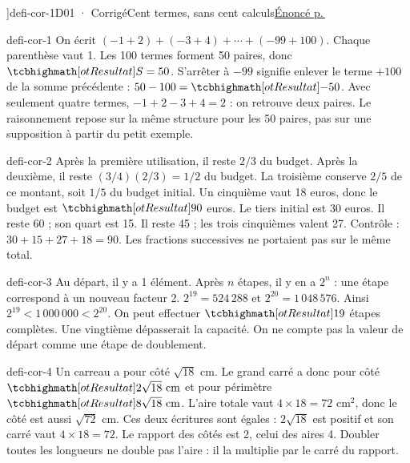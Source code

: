 \editionPage[\pdfbookmark[0]{Corrigés des défis}{bm-defi-cor-1-parent}]{defi-cor-1}{D01 · Corrigé}{Cent termes, sans cent calculs}{\hyperref[defi-ex-1]{Énoncé p.\,\pageref*{defi-ex-1}}}
\begin{blocEdition}{defi-cor-1}
On écrit $(-1+2)+(-3+4)+\cdots+(-99+100)$. Chaque parenthèse vaut 1. Les 100 termes forment 50 paires, donc $\res{S=50}$.
S’arrêter à $-99$ signifie enlever le terme $+100$ de la somme précédente : $50-100=\res{-50}$.
Avec seulement quatre termes, $-1+2-3+4=2$ : on retrouve deux paires. Le raisonnement repose sur la même structure pour les 50 paires, pas sur une supposition à partir du petit exemple.
\end{blocEdition}
\begin{blocEdition}{defi-cor-2}
Après la première utilisation, il reste $2/3$ du budget. Après la deuxième, il reste $(3/4)(2/3)=1/2$ du budget. La troisième conserve $2/5$ de ce montant, soit $1/5$ du budget initial.
Un cinquième vaut 18 euros, donc le budget est $\res{90}$ euros.
Le tiers initial est 30 euros. Il reste 60 ; son quart est 15. Il reste 45 ; les trois cinquièmes valent 27. Contrôle : $30+15+27+18=90$. Les fractions successives ne portaient pas sur le même total.
\end{blocEdition}
\begin{blocEdition}{defi-cor-3}
Au départ, il y a 1 élément. Après $n$ étapes, il y en a $2^n$ : une étape correspond à un nouveau facteur 2.
$2^{19}=524\,288$ et $2^{20}=1\,048\,576$. Ainsi $2^{19}<1\,000\,000<2^{20}$.
On peut effectuer $\res{19}$ étapes complètes. Une vingtième dépasserait la capacité. On ne compte pas la valeur de départ comme une étape de doublement.
\end{blocEdition}
\begin{blocEdition}{defi-cor-4}
Un carreau a pour côté $\sqrt{18}$ cm. Le grand carré a donc pour côté $\res{2\sqrt{18}\ \mathrm{cm}}$ et pour périmètre $\res{8\sqrt{18}\ \mathrm{cm}}$.
L’aire totale vaut $4\times18=72$ cm$^2$, donc le côté est aussi $\sqrt{72}$ cm. Ces deux écritures sont égales : $2\sqrt{18}$ est positif et son carré vaut $4\times18=72$.
Le rapport des côtés est 2, celui des aires 4. Doubler toutes les longueurs ne double pas l’aire : il la multiplie par le carré du rapport.\label{fig-defi-cor-4}

\end{blocEdition}
